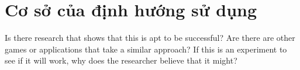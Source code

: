 \documentclass[../DoAn.tex]{subfiles}
\begin{document}
\section{Cơ sở của định hướng sử dụng}
\label{section:2.4}
Is there research that shows that this is apt to be successful? Are there are other games or applications that take a similar approach? If this is an experiment to see if it will work, why does the researcher believe that it might?

\end{document}
